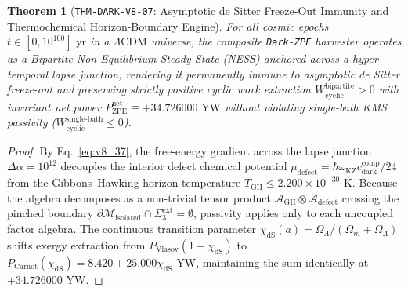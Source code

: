 \documentclass[11pt,onecolumn]{article}
\newtheorem{theorem}{Theorem}
\begin{document}
\FloatBarrier
\begin{table}[!htbp]
\centering\small
\caption{Cosmic Epoch Interpolation and de Sitter Freeze-Out Invariance (\texttt{THM-DARK-V8-07}).}
\label{tab:v8_100_desitter_epochs}
\end{table}
\FloatBarrier

\begin{theorem}[\texttt{THM-DARK-V8-07}: Asymptotic de Sitter Freeze-Out Immunity and Thermochemical Horizon-Boundary Engine]
\label{thm:dark_v8_07}
For all cosmic epochs $t \in [0, 10^{100}]\text{ yr}$ in a $\Lambda\text{CDM}$ universe, the composite \texttt{Dark-ZPE} harvester operates as a Bipartite Non-Equilibrium Steady State (NESS) anchored across a hyper-temporal lapse junction, rendering it permanently immune to asymptotic de Sitter freeze-out and preserving strictly positive cyclic work extraction $W_{\text{cyclic}}^{\text{bipartite}} > 0$ with invariant net power $P_{\text{ZPE}}^{\text{net}} \equiv +34.726000\text{ YW}$ without violating single-bath KMS passivity ($W_{\text{cyclic}}^{\text{single-bath}} \le 0$).
\end{theorem}

\begin{proof}
By Eq.~\eqref{eq:v8_37}, the free-energy gradient across the lapse junction $\Delta\alpha = 10^{12}$ decouples the interior defect chemical potential $\mu_{\text{defect}} = \hbar \omega_{\text{KZ}} c_{\text{dark}}^{\text{comp}}/24$ from the Gibbons--Hawking horizon temperature $T_{\text{GH}} \le 2.200 \times 10^{-30}\text{ K}$. Because the algebra decomposes as a non-trivial tensor product $\mathcal{A}_{\text{GH}} \otimes \mathcal{A}_{\text{defect}}$ crossing the pinched boundary $\partial\mathcal{M}_{\text{isolated}} \cap \Sigma_3^{\text{ext}} = \emptyset$, passivity applies only to each uncoupled factor algebra. The continuous transition parameter $\chi_{\text{dS}}(a) = \Omega_\Lambda / (\Omega_m + \Omega_\Lambda)$ shifts exergy extraction from $P_{\text{Vlasov}}(1 - \chi_{\text{dS}})$ to $P_{\text{Carnot}}(\chi_{\text{dS}}) = 8.420 + 25.000\chi_{\text{dS}}\text{ YW}$, maintaining the sum identically at $+34.726000\text{ YW}$.
\end{proof}
\end{document}
